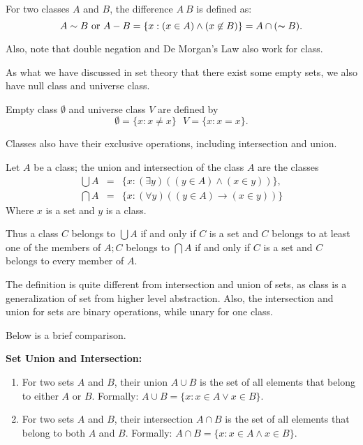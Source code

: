 \begin{definition}
For two classes $A$ and $B$, the difference $A~B$ is defined as:
$$
A\sim B \text{ or } A-B=\{x:(x\in A)\land(x\not\in B)\}=A\cap(\thicksim B).
$$
\end{definition}
Also, note that double negation and De Morgan's Law also work for class.

As what we have discussed in set theory that there exist some empty sets, we also have null class and
universe class.
\begin{definition}
    Empty class $\emptyset$ and universe class $V$ are defined by
    $$\emptyset=\{x:x\neq x\}\ \ \ V=\{x:x=x\}.$$
\end{definition}
Classes also have their exclusive operations, including intersection and union.
\begin{definition}
    Let $A$ be a class; the union and intersection of the class $A$ are
    the classes
    $$
    \begin{array}{rcl}\bigcup A&=&\{x:(\exists y)((y\in A)\land(x\in y))\},\\
        \bigcap A&=&\{x:(\forall y)((y\in A)\to (x\in y))\}\end{array}
    $$
    Where $x$ is a set and $y$ is a class.
\end{definition}
Thus a class $C$ belongs to $\bigcup A$ if and only if $C$ is a set and $C$ belongs to at least one of the 
members of $A;C$ belongs to $\bigcap A$ if and only if $C$ is a set and $C$ belongs to every member of $A.$

The definition is quite different from intersection and union of sets, as class is a generalization
of set from higher level abstraction. Also, the intersection and union for sets are binary operations,
while unary for one class. 

Below is a brief comparison.

\textbf{Set Union and Intersection:}
\begin{enumerate}
\item For two sets $A$ and $B$, their union $A \cup B$ is the set of all elements that belong to either $A$ or $B$. Formally: $A \cup B = \{x : x \in A \lor x \in B\}$.
\item For two sets $A$ and $B$, their intersection $A \cap B$ is the set of all elements that belong to both $A$ and $B$. Formally: $A \cap B = \{x : x \in A \land x \in B\}$.
\end{enumerate}

